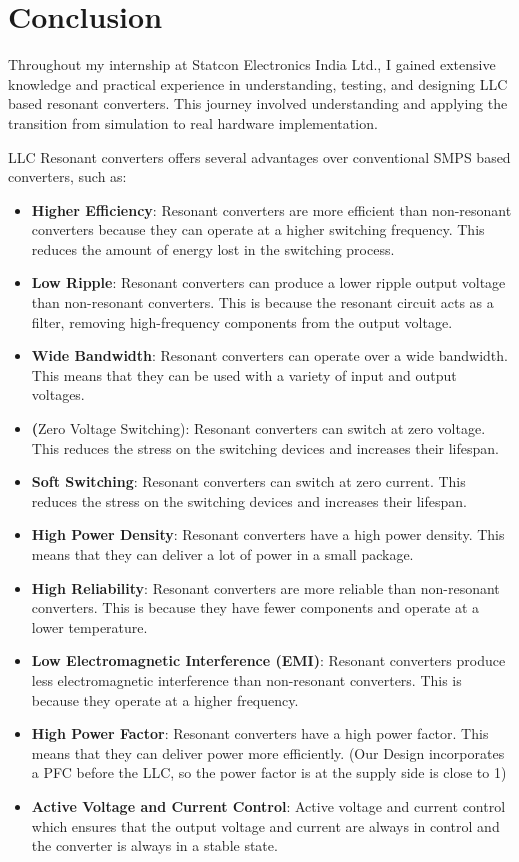 \section{Conclusion}
Throughout my internship at Statcon Electronics India Ltd., I gained extensive
knowledge and practical experience in understanding, testing, and designing
LLC based resonant converters. This journey involved understanding and applying
the transition from simulation to real hardware implementation.

\noindent
LLC Resonant converters offers several advantages over conventional SMPS based
converters, such as:
\begin{itemize}
    \item \textbf{Higher Efficiency}: Resonant converters are more efficient than non-resonant converters because they can operate at a higher switching frequency. This reduces the amount of energy lost in the switching process.
    \item \textbf{Low Ripple}: Resonant converters can produce a lower ripple output voltage than non-resonant converters. This is because the resonant circuit acts as a filter, removing high-frequency components from the output voltage.
    \item \textbf{Wide Bandwidth}: Resonant converters can operate over a wide bandwidth. This means that they can be used with a variety of input and output voltages.
    \item \textbf(Zero Voltage Switching): Resonant converters can switch at zero voltage. This reduces the stress on the switching devices and increases their lifespan.
    \item \textbf{Soft Switching}: Resonant converters can switch at zero current. This reduces the stress on the switching devices and increases their lifespan.
    \item \textbf{High Power Density}: Resonant converters have a high power density. This means that they can deliver a lot of power in a small package.
    \item \textbf{High Reliability}: Resonant converters are more reliable than non-resonant converters. This is because they have fewer components and operate at a lower temperature.
    \item \textbf{Low Electromagnetic Interference (EMI)}: Resonant converters produce less electromagnetic interference than non-resonant converters. This is because they operate at a higher frequency.
    \item \textbf{High Power Factor}: Resonant converters have a high power factor. This means that they can deliver power more efficiently. (Our Design incorporates a PFC before the LLC, so the power factor is at the supply side is close to 1)
    \item \textbf{Active Voltage and Current Control}: Active voltage and current control which ensures that the output voltage and current are always in control and the converter is always in a stable state.
\end{itemize}

